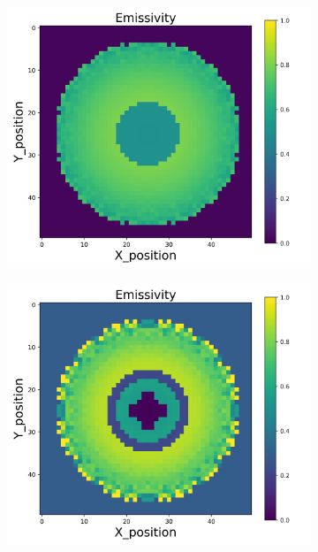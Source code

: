 {\begin{figure}[p]
\begin{minipage}{\textwidth}
\begin{subfigure}{0.325\textwidth}
        \end{subfigure}
        \begin{subfigure}{0.325\textwidth}
            \centering
            \includegraphics[width=\textwidth]{figures/raw_data/26/linear/emi_cal.jpg}
        \end{subfigure}
        \begin{subfigure}{0.325\textwidth}
            \centering
            \includegraphics[width=\textwidth]{figures/raw_data/31/linear/emi_cal.jpg}

\end{subfigure}
\end{minipage}
\end{figure}}
